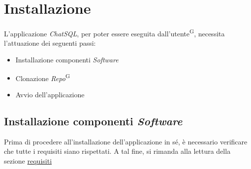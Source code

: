 \documentclass[5pt]{article}
\begin{document}
	\newpage	
	\section{Installazione}
		L'applicazione \textit{ChatSQL}, per poter essere eseguita dall'utente\textsuperscript{G}, necessita l'attuazione dei seguenti passi:
		\begin{itemize}
			\item Installazione componenti \textit{Software}
			\item Clonazione \textit{Repo}\textsuperscript{G}
			\item Avvio dell'applicazione
		\end{itemize}

		\subsection{Installazione componenti \textit{Software}}
			Prima di procedere all'installazione dell'applicazione in sé, è necessario verificare che tutte i requisiti siano rispettati.
			A tal fine, si rimanda alla lettura della sezione \hyperref[sec:requisiti]{requisiti}
			
\end{document}
